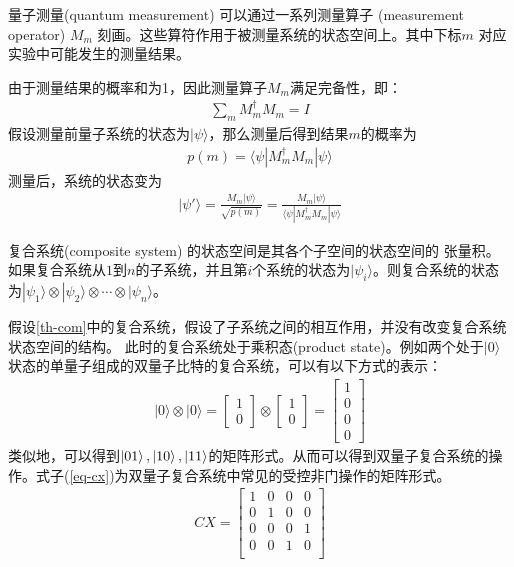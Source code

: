 \begin{theorem}\citep{nielsen2010quantum}
    \label{th-measurement}
    量子测量(quantum measurement) 可以通过一系列测量算子 (measurement operator) ${M_m}$ 刻画。这些算符作用于被测量系统的状态空间上。其中下标$m$
   对应实验中可能发生的测量结果。
\end{theorem}
由于测量结果的概率和为1，因此测量算子${M_m}$满足完备性，即：
\begin{align}
    \sum_m M_m^\dagger M_m = I
\end{align}
假设测量前量子系统的状态为\(|\psi\rangle\)，那么测量后得到结果$m$的概率为
\begin{align}
    p(m) = \langle\psi|M_m^\dagger M_m|\psi\rangle
\end{align}
测量后，系统的状态变为
\begin{align}
    |\psi'\rangle =  \frac{M_m|\psi\rangle}{\sqrt{p(m)}} = \frac{M_m|\psi\rangle}{\langle\psi|M_m^\dagger M_m|\psi\rangle}
\end{align}
\begin{theorem}\citep{nielsen2010quantum}
    复合系统(composite system) 的状态空间是其各个子空间的状态空间的
    张量积。如果复合系统从$1$到$n$的子系统，并且第$i$个系统的状态为$|\psi_i\rangle$。则复合系统的状态为\(|\psi_1\rangle\otimes|\psi_2\rangle\otimes\cdots\otimes |\psi_n\rangle\)。
    \label{th-com}
\end{theorem}
假设\ref{th-com}中的复合系统，假设了子系统之间的相互作用，并没有改变复合系统状态空间的结构。
此时的复合系统处于乘积态(product state)。例如两个处于\(|0\rangle\)状态的单量子组成的双量子比特的复合系统，可以有以下方式的表示：
\begin{align}
    |0\rangle\otimes|0\rangle=\left[\begin{matrix}
        1\\0
    \end{matrix}\right]\otimes\left[\begin{matrix}
        1\\0
    \end{matrix}\right] = \left[\begin{matrix}
        1\\0\\0\\0
    \end{matrix}\right]
\end{align}
类似地，可以得到\(\ket{01},\ket{10},\ket{11}\)的矩阵形式。从而可以得到双量子复合系统的操作。式子(\ref{eq-cx})为双量子复合系统中常见的受控非门操作的矩阵形式。
\begin{align}
    \label{eq-cx}
    CX=\left[\begin{matrix}
        1 & 0 & 0 & 0\\
        0 & 1 & 0 & 0\\
        0 & 0 & 0 & 1\\
        0 & 0 & 1 & 0\\
    \end{matrix}\right]
\end{align}


